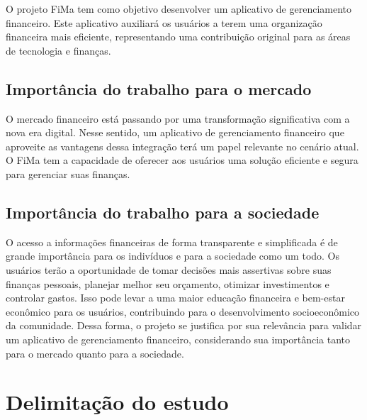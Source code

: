 O projeto FiMa tem como objetivo desenvolver um aplicativo de gerenciamento financeiro. Este aplicativo auxiliará os usuários a terem uma organização financeira mais eficiente, representando uma contribuição original para as áreas de tecnologia e finanças.

\subsection{Importância do trabalho para o mercado}
O mercado financeiro está passando por uma transformação significativa com a nova era digital. Nesse sentido, um aplicativo de gerenciamento financeiro que aproveite as vantagens dessa integração terá um papel relevante no cenário atual. O FiMa tem a capacidade de oferecer aos usuários uma solução eficiente e segura para gerenciar suas finanças.

\subsection{Importância do trabalho para a sociedade}
O acesso a informações financeiras de forma transparente e simplificada é de grande importância para os indivíduos e para a sociedade como um todo. Os usuários terão a oportunidade de tomar decisões mais assertivas sobre suas finanças pessoais, planejar melhor seu orçamento, otimizar investimentos e controlar gastos. Isso pode levar a uma maior educação financeira e bem-estar econômico para os usuários, contribuindo para o desenvolvimento socioeconômico da comunidade. Dessa forma, o projeto se justifica por sua relevância para validar um aplicativo de gerenciamento financeiro, considerando sua importância tanto para o mercado quanto para a sociedade.

\section{Delimitação do estudo}


